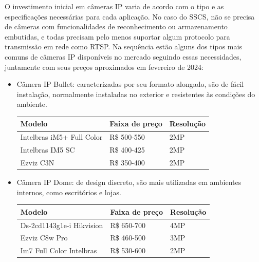 \documentclass[12pt, %
openright, 
oneside, %
a4paper,    %
brazil]{facom-ufu-abntex2}
\begin{document}
O investimento inicial em câmeras IP varia de acordo com o tipo e as
especificações necessárias para cada aplicação. No caso do SSCS, não se precisa
de câmeras com funcionalidades de reconhecimento ou armazenamento embutidas, e
todas precisam pelo menos suportar algum protocolo para transmissão em rede
como RTSP. Na sequência estão alguns dos tipos mais comuns de câmeras IP
disponíveis no mercado seguindo essas necessidades, juntamente com seus preços
aproximados em fevereiro de 2024:

\begin{itemize}
	\item Câmera IP Bullet: caracterizadas por seu formato alongado, são de
	      fácil instalação, normalmente instaladas no exterior e resistentes às condições
	      do ambiente.
	      \begin{center}
		      \begin{tabular}{|l|l|l|}
			      \hline
			      Modelo                    & Faixa de preço &
			      Resolução
			      \\ \hline
			      Intelbras iM5+ Full Color & R\$ 500-550    & 2MP
			      \\ \hline
			      Intelbras IM5 SC          & R\$ 400-425    & 2MP
			      \\ \hline
			      Ezviz C3N                 & R\$ 350-400    & 2MP
			      \\ \hline
		      \end{tabular}
	      \end{center}

	\item Câmera IP Dome: de design discreto, são mais utilizadas em
	      ambientes internos, como escritórios e lojas.
	      \begin{center}
		      \begin{tabular}{|l|l|l|}
			      \hline
			      Modelo                    & Faixa de preço &
			      Resolução
			      \\ \hline
			      Ds-2cd1143g1e-i Hikvision & R\$ 650-700    & 4MP
			      \\ \hline
			      Ezviz C8w Pro             & R\$ 460-500    & 3MP
			      \\ \hline
			      Im7 Full Color Intelbras  & R\$ 530-600    & 2MP
			      \\ \hline
		      \end{tabular}
	      \end{center}
\end{itemize}
\end{document}
